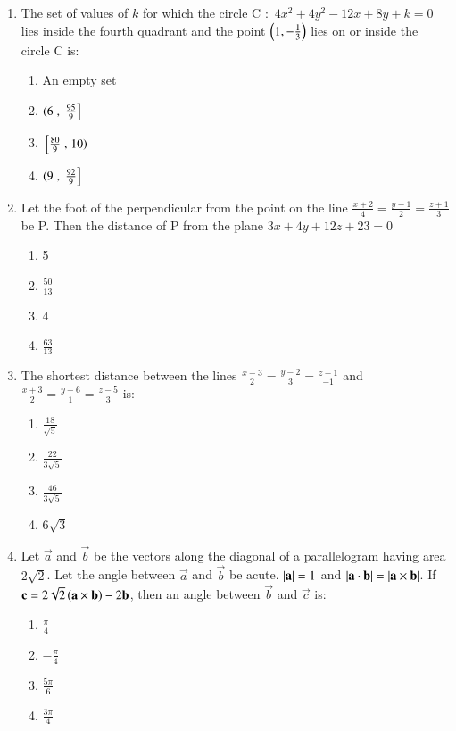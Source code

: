 \documentclass[journal]{IEEEtran}
\begin{document}
\begin{enumerate}
\item The set of values of $k$ for which the circle C $\colon$ $4x^2+4y^2-12x+8y+k=0$ lies inside the fourth quadrant and the point $\left(1,-\frac{1}{3}\right)$ lies on or inside the circle C is:
\begin{multicols}{2}
    \begin{enumerate}
        \item An empty set
        \item $\left(6\right., {}\left.\frac{95}{9}\right]$
        \item ${}\left[\frac{80}{9}\right., \left.10\right)$
        \item $\left(9\right., {}\left.\frac{92}{9}\right]$
    \end{enumerate}
\end{multicols}

\item Let the foot of the perpendicular from the point  on the line $\frac{x+2}{4} = \frac{y-1}{2} = \frac{z+1}{3}$ be P. Then the distance of P from the plane $3x+4y+12z+23=0$
\begin{multicols}{2}
    \begin{enumerate}
        \item 5
        \item $\frac{50}{13}$
        \item 4
        \item $\frac{63}{13}$
    \end{enumerate}
\end{multicols}

\item The shortest distance between the lines $\frac{x-3}{2} = \frac{y-2}{3} = \frac{z-1}{-1}$ and $\frac{x+3}{2} = \frac{y-6}{1} = \frac{z-5}{3}$ is:
\begin{multicols}{2}
    \begin{enumerate}
        \item $\frac{18}{\sqrt{5}}$
        \item $\frac{22}{3\sqrt{5}}$
        \item $\frac{46}{3\sqrt{5}}$
        \item $6\sqrt{3}$
    \end{enumerate}
\end{multicols}

\item Let $\vec{a}$ and $\vec{b}$ be the vectors along the diagonal of a parallelogram having area $2\sqrt{2}$. Let the angle between $\vec{a}$ and $\vec{b}$ be acute. $\left\vert\mathbf{a}\right\vert = 1$ and $\left\vert\mathbf{a} \cdot \mathbf{b}\right\vert = \left\vert\mathbf{a} \times \mathbf{b}\right\vert$. If $\mathbf{c} = 2\sqrt{2}\left(\mathbf{a} \times \mathbf{b}\right) - 2\mathbf{b}$, then an angle between $\vec{b}$ and $\vec{c}$ is:
\begin{multicols}{2}
    \begin{enumerate}
        \item $\frac{\pi}{4}$
        \item $-\frac{\pi}{4}$
        \item $\frac{5\pi}{6}$
        \item $\frac{3\pi}{4}$
    \end{enumerate}
\end{multicols}
\end{enumerate}
\end{document}
